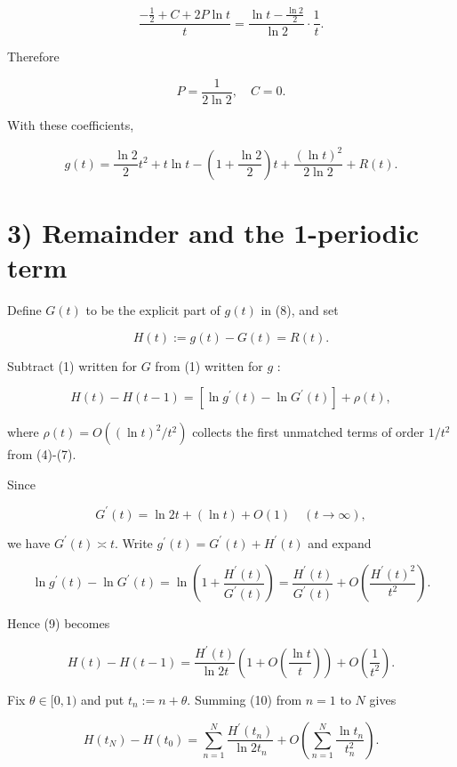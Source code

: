\documentclass[10pt]{article}
\begin{document}
$$
\frac{-\frac{1}{2}+C+2 P \ln t}{t}=\frac{\ln t-\frac{\ln 2}{2}}{\ln 2} \cdot \frac{1}{t} .
$$

Therefore

$$
P=\frac{1}{2 \ln 2}, \quad C=0 .
$$

With these coefficients,


\begin{equation*}
g(t)=\frac{\ln 2}{2} t^{2}+t \ln t-\left(1+\frac{\ln 2}{2}\right) t+\frac{(\ln t)^{2}}{2 \ln 2}+R(t) . \tag{8}
\end{equation*}


\section*{3) Remainder and the 1-periodic term}
Define $G(t)$ to be the explicit part of $g(t)$ in (8), and set

$$
H(t):=g(t)-G(t)=R(t) .
$$

Subtract (1) written for $G$ from (1) written for $g$ :


\begin{equation*}
H(t)-H(t-1)=\left[\ln g^{\prime}(t)-\ln G^{\prime}(t)\right]+\rho(t), \tag{9}
\end{equation*}


where $\rho(t)=O\left((\ln t)^{2} / t^{2}\right)$ collects the first unmatched terms of order $1 / t^{2}$ from (4)-(7).

Since

$$
G^{\prime}(t)=\ln 2 t+(\ln t)+O(1) \quad(t \rightarrow \infty),
$$

we have $G^{\prime}(t) \asymp t$. Write $g^{\prime}(t)=G^{\prime}(t)+H^{\prime}(t)$ and expand

$$
\ln g^{\prime}(t)-\ln G^{\prime}(t)=\ln \left(1+\frac{H^{\prime}(t)}{G^{\prime}(t)}\right)=\frac{H^{\prime}(t)}{G^{\prime}(t)}+O\left(\frac{H^{\prime}(t)^{2}}{t^{2}}\right) .
$$

Hence (9) becomes


\begin{equation*}
H(t)-H(t-1)=\frac{H^{\prime}(t)}{\ln 2 t}\left(1+O\left(\frac{\ln t}{t}\right)\right)+O\left(\frac{1}{t^{2}}\right) . \tag{10}
\end{equation*}


Fix $\theta \in[0,1)$ and put $t_{n}:=n+\theta$. Summing (10) from $n=1$ to $N$ gives

$$
H\left(t_{N}\right)-H\left(t_{0}\right)=\sum_{n=1}^{N} \frac{H^{\prime}\left(t_{n}\right)}{\ln 2 t_{n}}+O\left(\sum_{n=1}^{N} \frac{\ln t_{n}}{t_{n}^{2}}\right) .
$$
\end{document}
